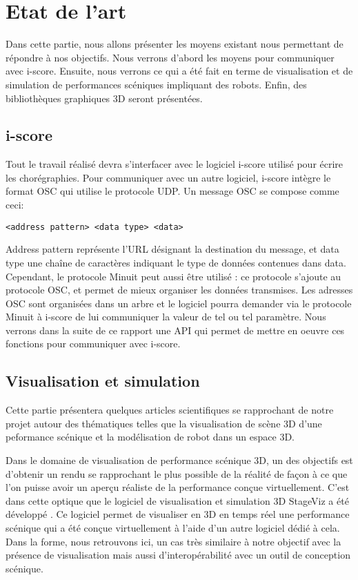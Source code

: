 \section{Etat de l'art}

Dans cette partie, nous allons présenter les moyens existant nous permettant de répondre à nos objectifs. Nous verrons d'abord les moyens pour communiquer avec i-score. Ensuite, nous verrons ce qui a été fait en terme de visualisation et de simulation de performances scéniques impliquant des robots. Enfin, des bibliothèques graphiques 3D seront présentées.


\subsection{i-score}

Tout le travail réalisé devra s'interfacer avec le logiciel i-score utilisé pour écrire les chorégraphies. Pour communiquer avec un autre logiciel, i-score intègre le format OSC qui utilise le protocole UDP. Un message OSC se compose comme ceci:
\begin{lstlisting}
<address pattern> <data type> <data>
\end{lstlisting}
Address pattern représente l'URL désignant la destination du message, et data type une chaîne de caractères indiquant le type de données contenues dans data.
Cependant, le protocole Minuit peut aussi être utilisé : ce protocole s'ajoute au protocole OSC, et permet de mieux organiser les données transmises. Les adresses OSC sont organisées dans un arbre et le logiciel pourra demander via le protocole Minuit à i-score de lui communiquer la valeur de tel ou tel paramètre. Nous verrons dans la suite de ce rapport une API qui permet de mettre en oeuvre ces fonctions pour communiquer avec i-score.

\subsection{Visualisation et simulation}

Cette partie présentera quelques articles scientifiques se rapprochant de notre projet autour des thématiques telles que la visualisation de scène 3D d'une peformance scénique et la modélisation de robot dans un espace 3D. 

Dans le domaine de visualisation de performance scénique 3D, un des objectifs est d'obtenir un rendu se rapprochant le plus possible de la réalité de façon à ce que l'on puisse avoir un aperçu réaliste de la performance conçue virtuellement. C'est dans cette optique que le logiciel de visualisation et simulation 3D StageViz\cite{StageViz} a été développé . Ce logiciel permet de visualiser en 3D en temps réel une performance scénique qui a été conçue virtuellement à l'aide d'un autre logiciel dédié à cela. Dans la forme, nous retrouvons ici, un cas très similaire à notre objectif avec la présence de visualisation mais aussi d'interopérabilité avec un outil de conception scénique.

